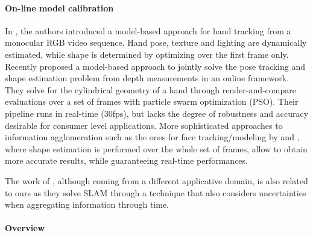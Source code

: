 
\paragraph{On-line model calibration}
In \cite{delagorce2011model}, the authors introduced a model-based approach for hand tracking from a monocular RGB video sequence. Hand pose, texture and lighting are dynamically estimated, while shape is determined by optimizing over the first frame only.
Recently \cite{makris2015model} proposed a model-based approach to jointly solve the pose tracking and shape estimation problem from depth measurements in an online framework. They solve for the cylindrical geometry of a hand through render-and-compare evaluations over a set of frames with particle swarm optimization (PSO). Their pipeline runs in real-time (30fps), but lacks the degree of robustness and accuracy desirable for consumer level applications. 
More sophisticated approaches to information agglomeration such as the ones for face tracking/modeling by \cite{bouaziz2013online} and \cite{li_sig13}, where shape estimation is performed over the whole set of frames, allow to obtain more accurate results, while guaranteeing real-time performances.
\begin{edit}
The work of \cite{zou2013coslam}, although coming from a different applicative domain, is also related to ours as they solve SLAM through a technique that also considers uncertainties when aggregating information through time.
\end{edit}

\paragraph{Overview}
 

